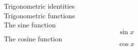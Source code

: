 \documentclass[12pt]{article}
\begin{document}
Trigonometric identities\\
Trigonometric functions\\
The sine function\\
$$\sin x$$
The cosine function\\
$$\cos x$$
\end{document}
